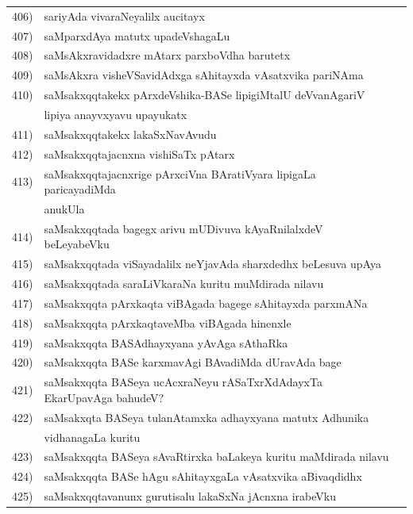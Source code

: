 {\begin{longtable}{@{}cp{7.4cm}r}
406) & sariyAda vivaraNeyalilx aucitayx & \pageref{page117}\\
407) & saMparxdAya matutx upadeVshagaLu & \pageref{page105}\\
408) & saMsAkxravidadxre mAtarx parxboVdha barutetx & \pageref{page124}\\
409) & saMsAkxra visheVSavidAdxga sAhitayxda vAsatxvika pariNAma & \pageref{page213}\\
410) & saMsakxqqtakekx pArxdeVshika-BASe lipigiMtalU deVvanAgariV & \\
     & lipiya anayvxyavu upayukatx & \pageref{page33}\\
411) & saMsakxqqtakekx lakaSxNavAvudu & \pageref{page2}\\
412) & saMsakxqqtajacnxna vishiSaTx pAtarx & \pageref{page30}\\
413) & saMsakxqqtajacnxrige pArxciVna BAratiVyara lipigaLa paricayadiMda & \\
     & anukUla & \pageref{page52}\\
414) & saMsakxqqtada bagegx arivu mUDivuva kAyaRnilalxdeV beLeyabeVku & \pageref{page21}\\
415) & saMsakxqqtada viSayadalilx neYjavAda sharxdedhx beLesuva upAya & \pageref{page31}\\
416) & saMsakxqqtada saraLiVkaraNa kuritu muMdirada nilavu & \pageref{page35}\\
417) & saMsakxqqta pArxkaqta viBAgada bagege sAhitayxda parxmANa & \pageref{page12}\\
418) & saMsakxqqta pArxkaqtaveMba viBAgada hinenxle & \pageref{page11}\\
419) & saMsakxqqta BASAdhayxyana yAvAga sAthaRka & \pageref{page27}\\
420) & saMsakxqqta BASe karxmavAgi BAvadiMda dUravAda bage & \pageref{page15}\\
421) & saMsakxqqta BASeya ucAcxraNeyu rASaTxrXdAdayxTa EkarUpavAga bahudeV? & \pageref{page33}\\
422) & saMsakxqta BASeya tulanAtamxka adhayxyana matutx Adhunika & \\
     & vidhanagaLa kuritu & \pageref{page52}\\
423)  & saMsakxqqta BASeya sAvaRtirxka baLakeya kuritu maMdirada nilavu & \pageref{page33}\\
424) & saMsakxqqta BASe hAgu sAhitayxgaLa vAsatxvika aBivaqdidhx & \pageref{page31}\\
425) & saMsakxqqtavanunx gurutisalu lakaSxNa jAcnxna irabeVku & \pageref{page1}\\ 

\end{longtable}}
